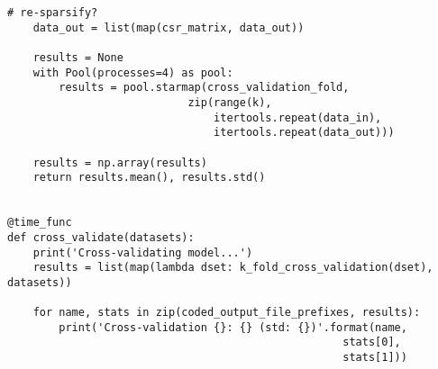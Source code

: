 \documentclass{kthreport}
\theoremstyle{definition}
\begin{document}
\begin{lstlisting}[style=MyPython]
	# re-sparsify?
	data_out = list(map(csr_matrix, data_out))
	
	results = None
	with Pool(processes=4) as pool:
		results = pool.starmap(cross_validation_fold,
							zip(range(k),
								itertools.repeat(data_in),
								itertools.repeat(data_out)))
	
	results = np.array(results)
	return results.mean(), results.std()


@time_func
def cross_validate(datasets):
	print('Cross-validating model...')
	results = list(map(lambda dset: k_fold_cross_validation(dset), datasets))
	
	for name, stats in zip(coded_output_file_prefixes, results):
		print('Cross-validation {}: {} (std: {})'.format(name,
													stats[0],
													stats[1]))
\end{lstlisting}
\end{document}
